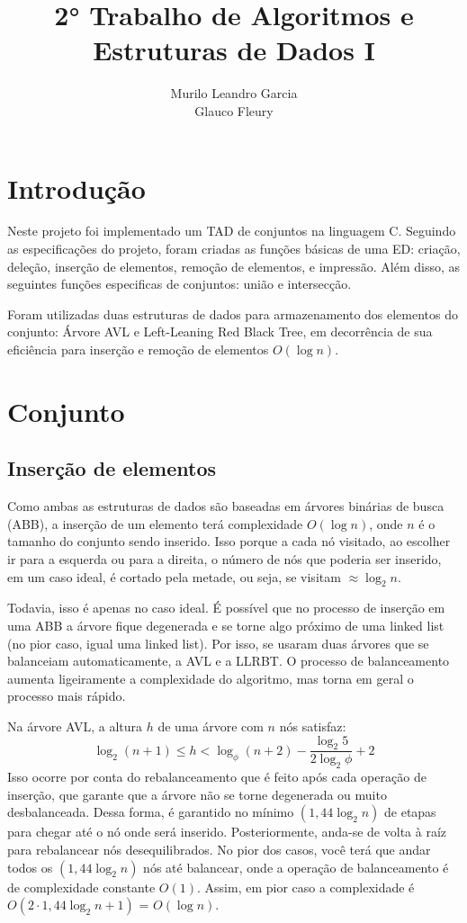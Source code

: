 \documentclass{article}
\title{2° Trabalho de Algoritmos e Estruturas de Dados I}
\author{
    Murilo Leandro Garcia \\ 
    Glauco Fleury
}
\date{}
\begin{document}
\maketitle

\section{Introdução}
Neste projeto foi implementado um TAD de conjuntos na linguagem C. Seguindo as especificações do projeto,
foram criadas as funções básicas de uma ED: criação, deleção, inserção de elementos, remoção de elementos, 
e impressão. Além disso, as seguintes funções especificas de conjuntos: união e intersecção.

Foram utilizadas duas estruturas de dados para armazenamento dos elementos do conjunto:
Árvore AVL e Left-Leaning Red Black Tree, em decorrência de sua eficiência para inserção e remoção de elementos
$O(\log n)$.

\section{Conjunto}
\subsection{Inserção de elementos}
Como ambas as estruturas de dados são baseadas em árvores binárias de busca (ABB), a inserção de um elemento terá
complexidade $O(\log n)$, onde $n$ é o tamanho do conjunto sendo inserido. Isso porque a cada nó visitado, ao escolher ir 
para a esquerda ou para a direita, o número de nós que poderia ser inserido, em um caso ideal, é cortado pela metade,
ou seja, se visitam $\approx \log_2 n$.

Todavia, isso é apenas no caso ideal. É possível que no processo de inserção em uma ABB a árvore fique degenerada
e se torne algo próximo de uma linked list (no pior caso, igual uma linked list). Por isso, se usaram duas árvores 
que se balanceiam automaticamente, a AVL e a LLRBT. O processo de balanceamento aumenta ligeiramente a complexidade
do algoritmo, mas torna em geral o processo mais rápido.

Na árvore AVL, a altura $h$ de uma árvore com $n$ nós satisfaz:
$$\log_2(n+1) \leq h < \log_\phi(n+2) - \frac{\log_2 5}{2\log_2\phi} + 2$$
Isso ocorre por conta do rebalanceamento que é feito após cada operação de inserção, que garante que a árvore 
não se torne degenerada ou muito desbalanceada. Dessa forma, é garantido no mínimo $(1,44\log_2 n)$ de etapas para chegar até o nó
onde será inserido. Posteriormente, anda-se de volta à raíz para rebalancear nós desequilibrados. No pior dos casos, você
terá que andar todos os $(1,44\log_2 n)$ nós até balancear, onde a operação de balanceamento é de complexidade constante $O(1)$.
Assim, em pior caso a complexidade é $O(2 \cdot 1,44 \log_2 n + 1)$ = $O(\log n)$.
\end{document}
